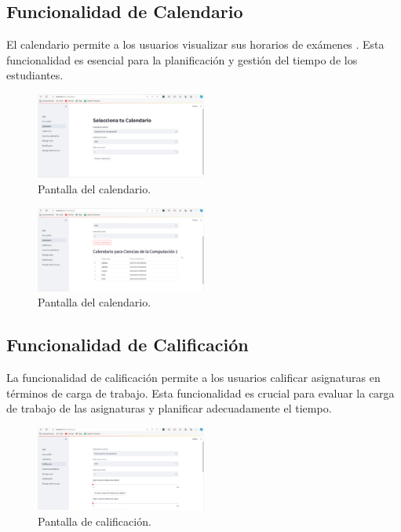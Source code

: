 \documentclass{article}
\begin{document}
\subsection{Funcionalidad de Calendario}

El calendario permite a los usuarios visualizar sus horarios de exámenes . Esta funcionalidad es esencial para la planificación y gestión del tiempo de los estudiantes.

\begin{figure}[H] \centering \includegraphics[width=0.5\textwidth]{calendario.png} \caption{Pantalla del calendario.} \end{figure}

\begin{figure}[h!] \centering \includegraphics[width=0.5\textwidth]{calendario1.png} \caption{Pantalla del calendario.} \end{figure}

\subsection{Funcionalidad de Calificación}

La funcionalidad de calificación permite a los usuarios calificar asignaturas en términos de carga de trabajo. Esta funcionalidad es crucial para evaluar la carga de trabajo de las asignaturas y planificar adecuadamente el tiempo.

\begin{figure}[h!] \centering \includegraphics[width=0.5\textwidth]{calificacion.png} \caption{Pantalla de calificación.} \end{figure}
\end{document}
